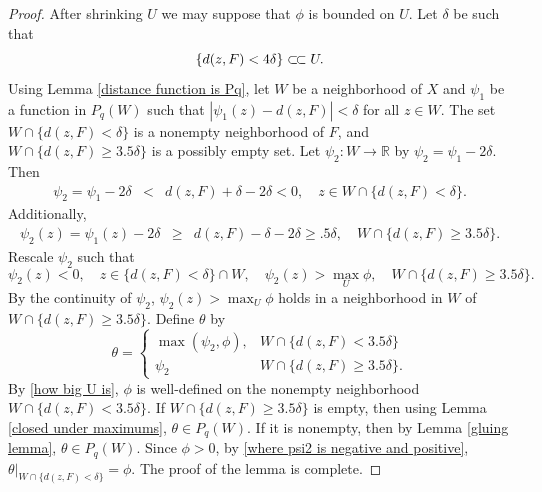 \documentclass[10pt,a4paper]{amsart}
\newcommand{\ssubset}{\subset\joinrel\subset}
\begin{document}
\begin{proof}
After shrinking $U$ we may suppose that $\phi$ is bounded on $U$.  Let $\delta$ be such that 
\begin{equation}\label{how big U is}
\{d(z, F) < 4\delta\} \ssubset U.
\end{equation}
Using Lemma \ref{distance function is Pq}, let $W$ be a neighborhood of $X$ and $\psi_1$ be a function in $P_q(W)$ such that
$|\psi_1(z) - d(z, F)| < \delta$ for all $z \in W$. The set $W \cap \{d(z, F) < \delta\}$ is a nonempty neighborhood of $F$, and $W \cap \{d(z, F) \geq 3.5\delta\}$ is a possibly empty set.
Let $\psi_2:W \to \mathbb{R}$ by $\psi_2 = \psi_1 - 2\delta$.  Then
\begin{eqnarray*}
    \psi_2 = \psi_1 - 2\delta &<& d(z, F) + \delta - 2\delta < 0, \quad z \in W \cap \{d(z, F) < \delta\}.
\end{eqnarray*}
Additionally,
\begin{eqnarray*}
\psi_2(z) = \psi_1(z) - 2\delta &\geq& d(z, F) - \delta - 2\delta \geq .5\delta, \quad W \cap \{d(z, F) \geq 3.5\delta\}.
\end{eqnarray*}
Rescale $\psi_2$ such that
\begin{equation}\label{where psi2 is negative and positive}
\psi_2(z) < 0, \quad z \in \{d(z, F) < \delta\} \cap W, \quad \psi_2(z) > \max_{U}\phi, \quad W \cap \{d(z, F) \geq 3.5\delta\}.
\end{equation}
By the continuity of $\psi_2$, $\psi_2(z) > \max_U \phi$ holds in a neighborhood in $W$ of $W \cap \{d(z, F) \geq 3.5\delta\}$. Define $\theta$ by
\begin{equation}
\theta = \begin{cases} 
\max(\psi_2, \phi), & W\cap \{d(z, F) < 3.5\delta\}
\\
\psi_2 & W \cap \{d(z, F) \geq 3.5\delta\}.
\end{cases}
\end{equation}
By \eqref{how big U is}, $\phi$ is well-defined on the nonempty neighborhood $W\cap \{d(z, F) < 3.5\delta\}$.  If $W \cap \{d(z, F) \geq 3.5\delta\}$ is empty, then using Lemma \ref{closed under maximums}, $\theta \in P_q(W)$.  If it is nonempty, then by Lemma \ref{gluing lemma}, $\theta \in P_q(W)$.  
Since $\phi > 0$, by \eqref{where psi2 is negative and positive},
$
\theta|_{W \cap \{d(z, F) < \delta\}} = \phi.
$
 The proof of the lemma is complete.


    
\end{proof}
\end{document}
